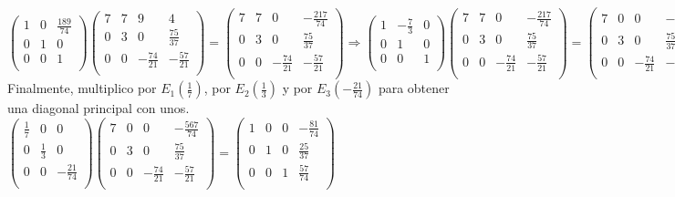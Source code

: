 \documentclass[11pt, a4paper]{article}
\newif\IfInSansMode
\theoremstyle{theorem-style}
\theoremstyle{definition-style}
\theoremstyle{remark-style}
\theoremstyle{example-style}
\begin{document}
$\begin{pmatrix}
1 & 0 & \frac{189}{74} \\
0 & 1 & 0 \\
0 & 0 & 1 \\
\end{pmatrix}  
\begin{pmatrix}
7 & 7 & 9 & 4 \\
0 & 3 & 0 & \frac{75}{37} \\
0 & 0 & -\frac{74}{21} & -\frac{57}{21} \\
\end{pmatrix} = 
\begin{pmatrix}
7 & 7 & 0 & -\frac{217}{74} \\
0 & 3 & 0 & \frac{75}{37} \\
0 & 0 & -\frac{74}{21} & -\frac{57}{21} \\
\end{pmatrix} \Longrightarrow
\begin{pmatrix}
1 & -\frac{7}{3} & 0 \\
0 & 1 & 0 \\
0 & 0 & 1 \\
\end{pmatrix}   
\begin{pmatrix}
7 & 7 & 0 & -\frac{217}{74} \\
0 & 3 & 0 & \frac{75}{37} \\
0 & 0 & -\frac{74}{21} & -\frac{57}{21} \\
\end{pmatrix} = 
\begin{pmatrix}
7 & 0 & 0 & -\frac{567}{74} \\
0 & 3 & 0 & \frac{75}{37} \\
0 & 0 & -\frac{74}{21} & -\frac{57}{21} \\
\end{pmatrix}$ \\

Finalmente, multiplico por $E_1(\frac{1}{7})$, por $E_2(\frac{1}{3})$ y por $E_3(-\frac{21}{74})$ para obtener una diagonal principal con unos. \\

$\begin{pmatrix}
\frac{1}{7} & 0 & 0 \\
0 & \frac{1}{3} & 0 \\
0 & 0 & -\frac{21}{74} \\
\end{pmatrix}    
\begin{pmatrix}
7 & 0 & 0 & -\frac{567}{74} \\
0 & 3 & 0 & \frac{75}{37} \\
0 & 0 & -\frac{74}{21} & -\frac{57}{21} \\
\end{pmatrix} = 
\begin{pmatrix}
1 & 0 & 0 & -\frac{81}{74} \\
0 & 1 & 0 & \frac{25}{37} \\
0 & 0 & 1 & \frac{57}{74} \\
\end{pmatrix}$ \\
\end{document}
